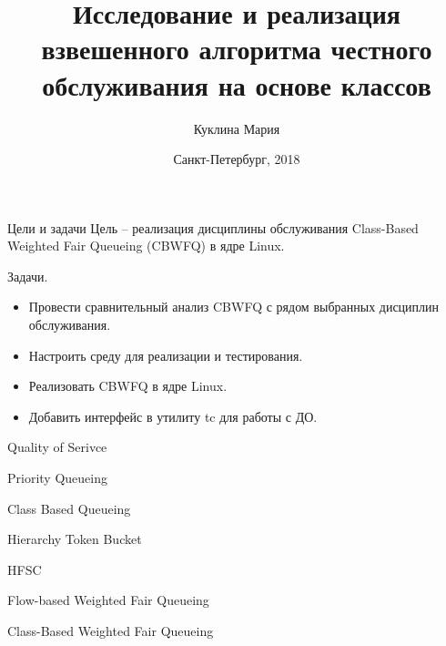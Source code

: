 \documentclass[12pt]{beamer}
\title[Исследование и реаализация ДО CBWFQ]{Исследование и реализация взвешенного алгоритма честного обслуживания на основе классов}
\author[]{Куклина Мария}
\institute[]{Университет ИТМО}
\date[]{Санкт-Петербург, 2018}
\begin{document}

\begin{darkbars}
    \begin{frame}
        \titlepage
    \end{frame}
\end{darkbars}


\begin{frame}{Цели и задачи}
    Цель -- реализация дисциплины обслуживания Class-Based Weighted Fair Queueing
    (CBWFQ) в ядре Linux.
    
    Задачи.
    {\small
        \begin{itemize}
            \item Провести сравнительный анализ CBWFQ с рядом выбранных дисциплин обслуживания.
            \item Настроить среду для реализации и тестирования.
            \item Реализовать CBWFQ в ядре Linux.
            \item Добавить интерфейс в утилиту tc для работы с ДО.
        \end{itemize}
    }
\end{frame}

\begin{frame}{Quality of Serivce}
\end{frame}

\begin{frame}{Priority Queueing}
\end{frame}

\begin{frame}{Class Based Queueing}
\end{frame}

\begin{frame}{Hierarchy Token Bucket}
\end{frame}

\begin{frame}{HFSC}
\end{frame}
\begin{frame}{Flow-based Weighted Fair Queueing}
\end{frame}
\begin{frame}{Class-Based Weighted Fair Queueing}
\end{frame}
\end{document}
